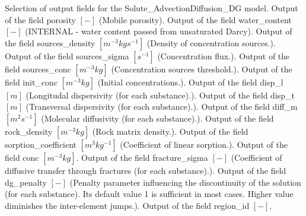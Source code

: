 \begin{SelectionType}
	{}
	{{{Selection of output fields for the Solute{\_}AdvectionDiffusion{\_}DG model.}}}
		\KeyItem
			{}
			{{{Output of the field porosity }{$[-]$}{ (Mobile porosity).}}}
		\KeyItem
			{}
			{{{Output of the field water{\_}content }{$[-]$}{ (INTERNAL - water content passed from unsaturated Darcy).}}}
		\KeyItem
			{}
			{{{Output of the field sources{\_}density }{$[m^{-3}kgs^{-1}]$}{ (Density of concentration sources.).}}}
		\KeyItem
			{}
			{{{Output of the field sources{\_}sigma }{$[s^{-1}]$}{ (Concentration flux.).}}}
		\KeyItem
			{}
			{{{Output of the field sources{\_}conc }{$[m^{-3}kg]$}{ (Concentration sources threshold.).}}}
		\KeyItem
			{}
			{{{Output of the field init{\_}conc }{$[m^{-3}kg]$}{ (Initial concentrations.).}}}
		\KeyItem
			{}
			{{{Output of the field disp{\_}l }{$[m]$}{ (Longitudal dispersivity (for each substance).).}}}
		\KeyItem
			{}
			{{{Output of the field disp{\_}t }{$[m]$}{ (Transversal dispersivity (for each substance).).}}}
		\KeyItem
			{}
			{{{Output of the field diff{\_}m }{$[m^{2}s^{-1}]$}{ (Molecular diffusivity (for each substance).).}}}
		\KeyItem
			{}
			{{{Output of the field rock{\_}density }{$[m^{-3}kg]$}{ (Rock matrix density.).}}}
		\KeyItem
			{}
			{{{Output of the field sorption{\_}coefficient }{$[m^{3}kg^{-1}]$}{ (Coefficient of linear sorption.).}}}
		\KeyItem
			{}
			{{{Output of the field conc }{$[m^{-3}kg]$}{.}}}
		\KeyItem
			{}
			{{{Output of the field fracture{\_}sigma }{$[-]$}{ (Coefficient of diffusive transfer through fractures (for each substance).).}}}
		\KeyItem
			{}
			{{{Output of the field dg{\_}penalty }{$[-]$}{ (Penalty parameter influencing the discontinuity of the solution (for each substance). Its default value 1 is sufficient in most cases. Higher value diminishes the inter-element jumps.).}}}
		\KeyItem
			{}
			{{{Output of the field region{\_}id }{$[-]$}{.}}}
\end{SelectionType}
